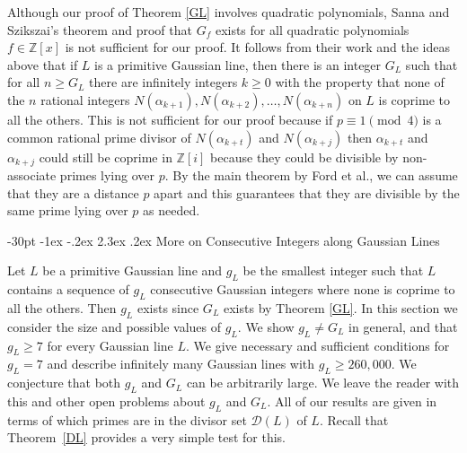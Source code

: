 \documentclass[11pt]{article}
\makeatletter
\renewcommand\section{\@startsection {section}{1}{\z@}
{-30pt \@plus -1ex \@minus -.2ex}
{2.3ex \@plus.2ex}
{\normalfont\normalsize\bfseries\boldmath}}
\newcommand{\Z}{\mathbb{Z}}
\newcommand{\DL}{{\mathcal{D}}(L)}
\makeatother
\begin{document}
 Although our proof of Theorem \ref{GL} involves quadratic polynomials,  Sanna and Szikszai's  \cite{sanna} theorem and proof  that $G_f$ exists for all quadratic polynomials $f\in\Z[x]$ is not sufficient for our proof.  It follows from their work and the ideas above that if 
$L$ is a primitive Gaussian line, then there is an integer $G_L$ such that for all $n\geq G_L$ there are infinitely integers $k\geq 0$ with the property that none of the $n$ rational  integers $N(\alpha_{k+1}), N(\alpha_{k+2}),\ldots, N(\alpha_{k+n})$ on $L$ is coprime to all the others.  This is not sufficient for our proof because if $p\equiv 1 \pmod 4$ is a common rational prime divisor of  $N(\alpha_{k+t})$ and $N(\alpha_{k+j})$ then
$\alpha_{k+t}$ and $\alpha_{k+j}$ could still be coprime in $\Z[i]$ because they could be divisible by non-associate primes lying over $p$. By the main theorem by Ford et al., we can assume that they are a distance $p$ apart and this guarantees that they are divisible by the same prime lying over $p$ as needed.

\section{More on Consecutive Integers along Gaussian Lines}

Let $L$ be a primitive Gaussian line and  $g_L$ be the smallest integer such that $L$ contains a  sequence of $g_L$ consecutive Gaussian integers where none is coprime to all the others. Then $g_L$ exists since $G_L$ exists by Theorem \ref{GL}.  In this section we consider the size and possible values of $g_L$.   We show $g_L\neq G_L$ in general, and that $g_L\geq 7$ for every Gaussian line  $L$. We give necessary and sufficient conditions for $g_L=7$ and describe infinitely many Gaussian lines with $g_L\geq 260{,}000$.  We conjecture that both $g_L$ and $G_L$ can be arbitrarily large. We leave the reader with this and other open problems about $g_L$ and $G_L$.  All of our results are given in terms of which primes are in the divisor set $\DL$ of $L$.  Recall that Theorem~\ref{DL} provides a very simple test for this.
\end{document}
